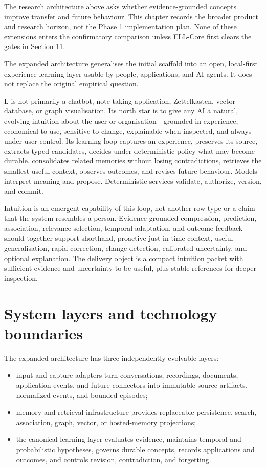 \documentclass[
  english,
  a4paper,
  DIV=11,
  numbers=noendperiod]{scrreprt}
\providecommand{\tightlist}{%
  \setlength{\itemsep}{0pt}\setlength{\parskip}{0pt}}
\begin{document}
The research architecture above asks whether evidence-grounded concepts
improve transfer and future behaviour. This chapter records the broader
product and research horizon, not the Phase 1 implementation plan. None
of these extensions enters the confirmatory comparison unless ELL-Core
first clears the gates in Section 11.

The expanded architecture generalises the initial scaffold into an open,
local-first experience-learning layer usable by people, applications,
and AI agents. It does not replace the original empirical question.

L is not primarily a chatbot, note-taking application, Zettelkasten,
vector database, or graph visualisation. Its north star is to give any
AI a natural, evolving intuition about the user or
organisation---grounded in experience, economical to use, sensitive to
change, explainable when inspected, and always under user control. Its
learning loop captures an experience, preserves its source, extracts
typed candidates, decides under deterministic policy what may become
durable, consolidates related memories without losing contradictions,
retrieves the smallest useful context, observes outcomes, and revises
future behaviour. Models interpret meaning and propose. Deterministic
services validate, authorize, version, and commit.

Intuition is an emergent capability of this loop, not another row type
or a claim that the system resembles a person. Evidence-grounded
compression, prediction, association, relevance selection, temporal
adaptation, and outcome feedback should together support shorthand,
proactive just-in-time context, useful generalisation, rapid correction,
change detection, calibrated uncertainty, and optional explanation. The
delivery object is a compact intuition packet with sufficient evidence
and uncertainty to be useful, plus stable references for deeper
inspection.

\section{System layers and technology
boundaries}\label{system-layers-and-technology-boundaries}

The expanded architecture has three independently evolvable layers:

\begin{itemize}
\tightlist
\item
  input and capture adapters turn conversations, recordings, documents,
  application events, and future connectors into immutable source
  artifacts, normalized events, and bounded episodes;
\item
  memory and retrieval infrastructure provides replaceable persistence,
  search, association, graph, vector, or hosted-memory projections;
\item
  the canonical learning layer evaluates evidence, maintains temporal
  and probabilistic hypotheses, governs durable concepts, records
  applications and outcomes, and controls revision, contradiction, and
  forgetting.
\end{itemize}
\end{document}

